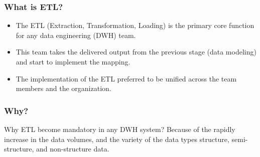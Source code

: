 \begin{frame}
	\frametitle{What is ETL?}

	\begin{itemize}
		\item The ETL (Extraction, Transformation, Loading) is the primary core function for any data engineering (DWH) team.

		\item This team takes the delivered output from the previous stage (data modeling) and start to implement the mapping.

		\item The implementation of the ETL preferred to be unified across the team members and the organization.

	\end{itemize}

\end{frame}
\begin{frame}
	\frametitle{Why?}
	\centering
	\begin{block}{Why ETL become mandatory in any DWH system? }
		Because of the rapidly increase in the data volumes,
		and the variety of the data types structure, semi-structure, and non-structure data.
	\end{block}

\end{frame}

